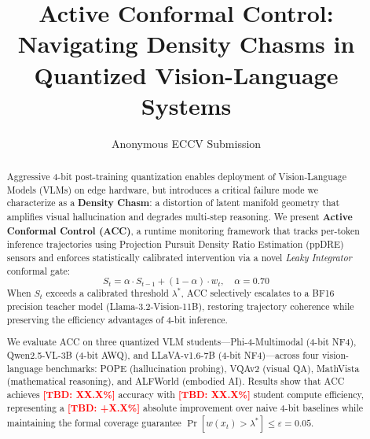 \documentclass[runningheads]{llncs}
\newcommand{\TBD}[1]{\textcolor{red}{\textbf{[TBD: #1]}}}
\newcommand{\lstar}{\lambda^*}
\begin{document}
\title{Active Conformal Control: Navigating Density Chasms in\\
Quantized Vision-Language Systems}


\author{Anonymous ECCV Submission}

\maketitle

\begin{abstract}
Aggressive 4-bit post-training quantization enables deployment of
Vision-Language Models (VLMs) on edge hardware, but introduces a critical
failure mode we characterize as a \textbf{Density Chasm}: a distortion of
latent manifold geometry that amplifies visual hallucination and degrades
multi-step reasoning. We present \textbf{Active Conformal Control (ACC)},
a runtime monitoring framework that tracks per-token inference trajectories
using Projection Pursuit Density Ratio Estimation (ppDRE) sensors and
enforces statistically calibrated intervention via a novel \emph{Leaky
Integrator} conformal gate:
\[
  S_t = \alpha \cdot S_{t-1} + (1-\alpha)\cdot w_t, \quad\alpha = 0.70
\]
When $S_t$ exceeds a calibrated threshold $\lstar$, ACC selectively escalates
to a BF16 precision teacher model (Llama-3.2-Vision-11B), restoring trajectory
coherence while preserving the efficiency advantages of 4-bit inference.

We evaluate ACC on three quantized VLM students---Phi-4-Multimodal (4-bit NF4),
Qwen2.5-VL-3B (4-bit AWQ), and LLaVA-v1.6-7B (4-bit NF4)---across four
vision-language benchmarks: POPE (hallucination probing), VQAv2 (visual QA),
MathVista (mathematical reasoning), and ALFWorld (embodied AI).
Results show that ACC achieves \TBD{XX.X\%} accuracy with \TBD{XX.X\%} student
compute efficiency, representing a \TBD{+X.X\%} absolute improvement over
naive 4-bit baselines while maintaining the formal coverage guarantee
$\Pr[w(x_t) > \lstar] \leq \varepsilon = 0.05$.

\end{abstract}

\end{document}
